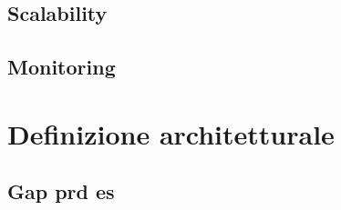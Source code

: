 \subsection{Scalability}



\subsection{Monitoring}




\section{Definizione architetturale}

\subsection{Gap prd es}


